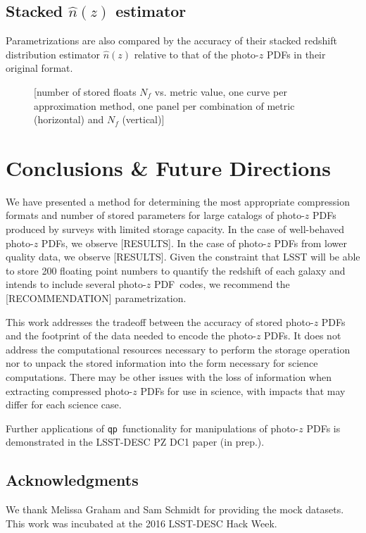 \documentclass[\docopts]{\docclass}
\newcommand{\qp}{\texttt{qp}}
\newcommand{\pz}{photo-$z$ PDF}
\begin{document}
\subsection{Stacked $\hat{n}(z)$ estimator}
\label{sec:stacked}

Parametrizations are also compared by the accuracy of their stacked redshift 
distribution estimator $\hat{n}(z)$ relative to that of the \pz s in their 
original format.

\begin{figure}
  \caption{[number of stored floats $N_{f}$ vs. metric value, one curve per 
approximation method, one panel per combination of metric (horizontal) and 
$N_{f}$ (vertical)]
  \label{fig:stacked}}
\end{figure}





\section{Conclusions \& Future Directions}
\label{sec:conclusions}

We have presented a method for determining the most appropriate compression 
formats and number of stored parameters for large catalogs of \pz s produced by 
surveys with limited storage capacity.   In the case of well-behaved \pz s, we 
observe [RESULTS].  In the case of \pz s from lower quality data, we observe 
[RESULTS].  Given the constraint that LSST will be able to store 200 floating 
point numbers to quantify the redshift of each galaxy and intends to include 
several \pz\ codes, we recommend the [RECOMMENDATION] parametrization.



This work addresses the tradeoff between the accuracy of stored \pz s and the 
footprint of the data needed to encode the \pz s.  It does not address the 
computational resources necessary to perform the storage operation nor to 
unpack the stored information into the form necessary for science computations. 
 There may be other issues with the loss of information when extracting 
compressed \pz s for use in science, with impacts that may differ for each 
science case.

Further applications of \qp\ functionality for manipulations of \pz s is 
demonstrated in the LSST-DESC PZ DC1 paper (in prep.).

\subsection*{Acknowledgments}


We thank Melissa Graham and Sam Schmidt for providing the mock datasets.  This 
work was incubated at the 2016 LSST-DESC Hack Week.







\end{document}
